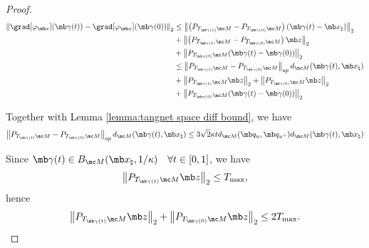 \begin{proof}
\begin{equation}
    \begin{aligned}
        \left\| \grad[\varphi_{\mb x}](\mb\gamma(t)) - \grad[\varphi_{\mb x}](\mb\gamma(0)) \right\|_2 
        &\leq \left\| \left(P_{T_{\mb\gamma(t)} \mc M} - P_{T_{\mb\gamma(0)} \mc M}\right)(\mb\gamma(t)-\mb x_\natural)\right\|_2\\
        &+  \left\| \left(P_{T_{\mb\gamma(t)} \mc M} - 
        P_{T_{\mb\gamma(0)} \mc M}\right) \mb z\right\|_2\\
        &+\left\|P_{T_{\mb\gamma(0)} \mc M}(\mb\gamma(t)-\mb\gamma(0)) \right\|_2\\
        &\leq \left\| P_{T_{\mb\gamma(t)} \mc M} - P_{T_{\mb\gamma(0)} \mc M}\right\|_{op} d_{\mc M}(\mb\gamma(t),\mb x_\natural)\\
        &+ \left\| P_{T_{\mb\gamma(t)} \mc M}  \mb z\right\|_2 + \left\| P_{T_{\mb\gamma(0)} \mc M}  \mb z\right\|_2\\
        &+ \left\|P_{T_{\mb\gamma(0)} \mc M}(\mb\gamma(t)-\mb\gamma(0)) \right\|_2
    \end{aligned}
\end{equation}

Together with Lemma \ref{lemma:tangnet space diff bound}, we have
\begin{equation}
    \left\| P_{T_{\mb\gamma(t)} \mc M} - P_{T_{\mb\gamma(0)} \mc M}\right\|_{op} d_{\mc M}(\mb\gamma(t),\mb x_\natural)
    \leq 3\sqrt{2} \kappa t d_{\mc M}(\mb q_u, \mb q_{u^+}) d_{\mc M}(\mb\gamma(t),\mb x_\natural)
\end{equation}

Since $\mb\gamma(t)\in B_{\mc M}(\mb x_\natural, 1/\kappa) \quad \forall t\in[0,1]$, we have
\begin{equation}
    \left\| P_{T_{\mb\gamma(t)} \mc M}  \mb z\right\|_2 \leq T_{\max},
\end{equation}
hence
\begin{equation}
    \left\| P_{T_{\mb\gamma(t)} \mc M}  \mb z\right\|_2+
    \left\| P_{T_{\mb\gamma(0)} \mc M}  \mb z\right\|_2 
    \leq 2T_{\max}.
\end{equation}


\end{proof}
